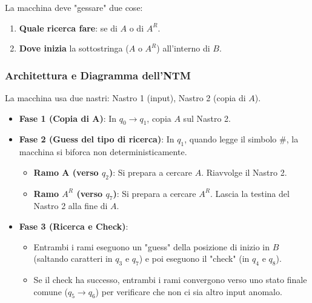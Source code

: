 \documentclass[a4paper]{article}
\theoremstyle{definition} %
\begin{document}
La macchina deve "gessare" due cose:
\begin{enumerate}
    \item \textbf{Quale ricerca fare}: se di $A$ o di $A^R$.
    \item \textbf{Dove inizia} la sottostringa ($A$ o $A^R$) all'interno di $B$.
\end{enumerate}

\subsubsection{Architettura e Diagramma dell'NTM}
La macchina usa due nastri: Nastro 1 (input), Nastro 2 (copia di $A$).
\begin{itemize}
    \item \textbf{Fase 1 (Copia di A)}: In $q_0 \to q_1$, copia $A$ sul Nastro 2.
    \item \textbf{Fase 2 (Guess del tipo di ricerca)}: In $q_1$, quando legge il simbolo $\#$, la macchina si biforca non deterministicamente.
        \begin{itemize}
            \item \textbf{Ramo A (verso $q_2$)}: Si prepara a cercare $A$. Riavvolge il Nastro 2.
            \item \textbf{Ramo $A^R$ (verso $q_7$)}: Si prepara a cercare $A^R$. Lascia la testina del Nastro 2 alla fine di $A$.
        \end{itemize}
    \item \textbf{Fase 3 (Ricerca e Check)}:
        \begin{itemize}
            \item Entrambi i rami eseguono un "guess" della posizione di inizio in $B$ (saltando caratteri in $q_3$ e $q_7$) e poi eseguono il "check" (in $q_4$ e $q_8$).
            \item Se il check ha successo, entrambi i rami convergono verso uno stato finale comune ($q_5 \to q_6$) per verificare che non ci sia altro input anomalo.
        \end{itemize}
\end{itemize}
\end{document}
